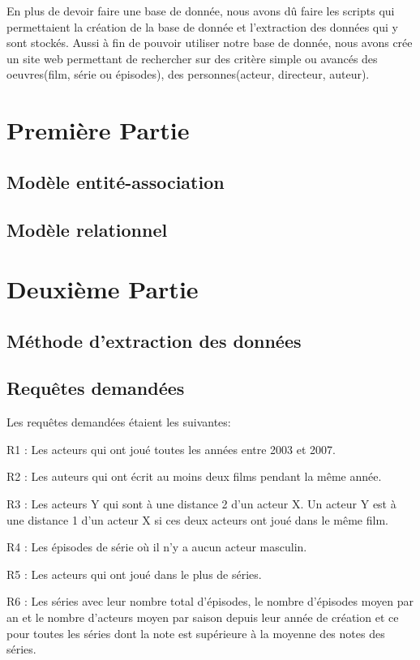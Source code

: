 \documentclass[10pt,a4paper]{article}
\begin{document}
En plus de devoir faire une base de donnée, nous avons dû faire les scripts qui permettaient la création de la base de donnée et l'extraction des données qui y sont stockés. Aussi à fin de pouvoir utiliser notre base de donnée, nous avons crée un site web permettant de rechercher sur des critère simple ou avancés des oeuvres(film, série ou épisodes), des personnes(acteur, directeur, auteur).

\newpage
\section{Première Partie}\label{première partie}

\subsection{Modèle entité-association}

\subsection{Modèle relationnel}

\newpage
\section{Deuxième Partie}\label{deuxieme partie}

\subsection{Méthode d'extraction des données}

\subsection{Requêtes demandées}
Les requêtes demandées étaient les suivantes:
\begin{list}{-}{}
  \item R1 : Les acteurs qui ont joué toutes les années entre 2003 et
    2007.
  \item R2 : Les auteurs qui ont écrit au moins deux films pendant la
    même année.
  \item R3 : Les acteurs Y qui sont à une distance 2 d'un acteur X. Un
    acteur Y est à une distance 1 d'un acteur X si ces deux acteurs
    ont joué dans le même film.
  \item R4 : Les épisodes de série où il n'y a aucun acteur masculin.
  \item R5 : Les acteurs qui ont joué dans le plus de séries.
  \item R6 : Les séries avec leur nombre total d'épisodes, le nombre
    d'épisodes moyen par an et le nombre d'acteurs moyen par saison
    depuis leur année de création et ce pour toutes les séries dont la
    note est supérieure à la moyenne des notes des séries.
\end{list}
\end{document}
